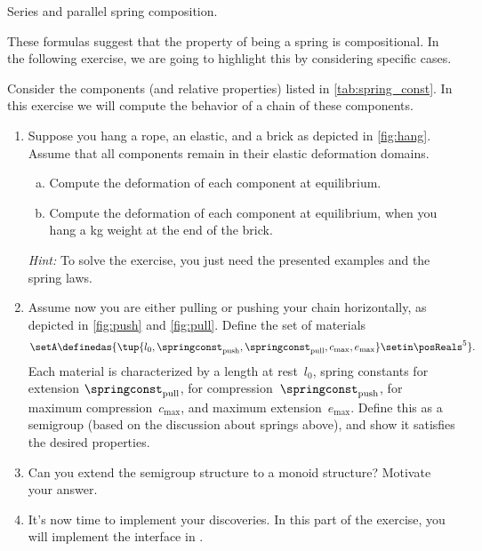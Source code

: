 \begin{marginfigure}
    \centering
    \hspace{1cm}
    \caption{Series and parallel spring composition.}
    \label{fig:springs}
\end{marginfigure}

These formulas suggest that the property of being a spring is compositional.
In the following exercise, we are going to highlight this by considering specific cases.

\begin{gradedexercise}
    \label{ex:Goldberg}
    Consider the components (and relative properties) listed in \cref{tab:spring_const}.
    In this exercise we will compute the behavior of a chain of these components.
    \begin{enumerate}
        \item Suppose you hang a rope, an elastic, and a brick as depicted in \cref{fig:hang}.
              Assume that all components remain in their elastic deformation domains.
              \begin{enumerate}[(a)]
                  \item Compute the deformation of each component at equilibrium.
                  \item Compute the deformation of each component at equilibrium, when you hang a \unit[1]{kg} weight at the end of the brick.
              \end{enumerate}
              \emph{Hint:}
              To solve the exercise, you just need the presented examples and the spring laws.
        \item Assume now you are either pulling or pushing your chain horizontally, as depicted in \cref{fig:push} and \cref{fig:pull}.
              Define the set of materials~
              \begin{equation}
                  \setA\definedas \{ \tup{l_0, \springconst_\mathrm{push},\springconst_\mathrm{pull}, c_\mathrm{max}, e_\mathrm{max}} \setin \posReals^5\}.
              \end{equation}
              Each material is characterized by a length at rest~$l_0$, spring constants for extension $\springconst_\mathrm{pull}$, for compression~$\springconst_\mathrm{push}$, for maximum compression~$c_\mathrm{max}$, and maximum extension~$e_\mathrm{max}$.
              Define this as a semigroup (based on the discussion about springs above), and show it satisfies the desired properties.
        \item Can you extend the semigroup structure to a monoid structure?
              Motivate your answer.
        \item It's now time to implement your discoveries.
              In this part of the exercise, you will implement the interface in .


\end{enumerate}
\end{gradedexercise}
